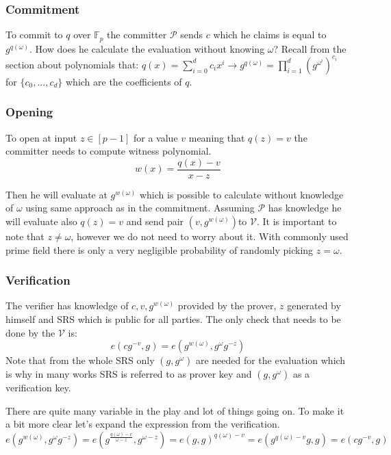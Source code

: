 \subsubsection{Commitment}
To commit to $q$ over $\mathbb{F}_p$ the committer $\mathcal{P}$ sends $c$ which he claims is equal to $g^{q(\omega)}$. How does he calculate the evaluation without knowing $\omega$? Recall from the section about polynomials that: $q(x) = \sum_{i=0}^{d} c_i x^i \rightarrow g^{q(\omega)} = \prod_{i=1}^d (g^{\omega^i})^{c_i}$ for $\{c_0, ... , c_d\}$ which are the coefficients of $q$.

\subsubsection{Opening}
To open at input $z \in [p-1]$ for a value $v$ meaning that $q(z) = v$ the committer needs to compute witness polynomial.
$$w(x) = \frac{q(x)-v}{x-z}$$


Then he will evaluate at $g^{w(\omega)}$ which is possible to calculate without knowledge of $\omega$ using same approach as in the commitment. Assuming $\mathcal{P}$ has knowledge he will evaluate also $q(z) = v$ and send pair $(v, g^{w(\omega)})$to $\mathcal{V}$. It is important to note that $z \neq \omega$, however we do not need to worry about it. With commonly used prime field there is only a very negligible probability of randomly picking $z = \omega$.

\subsubsection{Verification}
The verifier has knowledge of $c, v, g^{w(\omega)}$ provided by the prover, $z$ generated by himself and SRS which is public for all parties. The only check that needs to be done by the $\mathcal{V}$ is:
$$e(cg^{-v}, g) = e(g^{w(\omega)}, g^{\omega} g^{-z})$$
Note that from the whole SRS only $(g, g^\omega)$ are needed for the evaluation which is why in many works SRS is referred to as prover key and $(g, g^\omega)$ as a verification key. 

There are quite many variable in the play and lot of things going on. To make it a bit more clear let's expand the expression from the verification.
$$e(g^{w(\omega)}, g^{\omega} g^{-z}) = e(g^{\frac{q(\omega) -v}{\omega -z}}, g^{\omega -z}) = e(g, g)^{q(\omega) -v} = e(g^{q(\omega)-v} g, g) = e(c g^{-v}, g)$$

